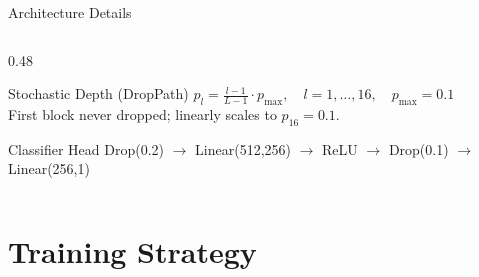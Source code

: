 \documentclass[aspectratio=169]{beamer}
\begin{document}
\begin{frame}[t,shrink=12]{Architecture Details}
\begin{columns}[T]
\begin{column}{0.48\textwidth}
      \smallskip
      \begin{block}{Stochastic Depth (DropPath)}
        \footnotesize
        $p_l = \tfrac{l-1}{L-1}\cdot p_{\max},\quad l=1,\ldots,16,\quad p_{\max}=0.1$\\[2pt]
        First block never dropped; linearly scales to $p_{16}=0.1$.
      \end{block}
      \smallskip
      \begin{block}{Classifier Head}
        \footnotesize
        Drop(0.2) $\to$ Linear(512,256) $\to$ ReLU $\to$ Drop(0.1) $\to$ Linear(256,1)
      \end{block}
    \end{column}
  \end{columns}
\end{frame}

\section{Training Strategy}
\end{document}
